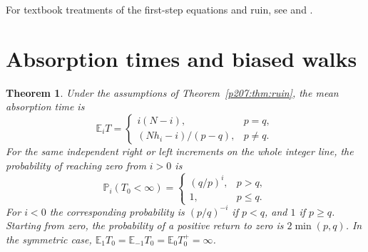 \documentclass[11pt,oneside,openany]{book}
\theoremstyle{plain}
\newtheorem{theorem}{Theorem}[chapter]
\theoremstyle{definition}
\theoremstyle{remark}
\begin{document}
For textbook treatments of the first-step equations and ruin,
see \cite[\S\S1.3 and 1.6]{Norris} and \cite[\S4.8.1]{Durrett}.

\section{Absorption times and biased walks}\label{p207:W21}

\begin{theorem}\label{p207:thm:ruin-time}
Under the assumptions of Theorem~\ref{p207:thm:ruin}, the mean absorption
time is
\[
 \mathbb E_i T=
 \begin{cases}
  i(N-i), & p=q,\\[2pt]
  (N h_i-i)/(p-q), & p\ne q.
 \end{cases}
\]
For the same independent right or left increments on the whole integer
line, the probability of reaching zero from \(i>0\) is
\[
 \mathbb P_i(T_0<\infty)=
 \begin{cases}
  (q/p)^i, & p>q,\\
  1, & p\leq q .
 \end{cases}
\]
For \(i<0\) the corresponding probability is \((p/q)^{-i}\) if \(p<q\),
and \(1\) if \(p\geq q\). Starting from zero, the probability of a
positive return to zero is \(2\min(p,q)\). In the symmetric case,
\(\mathbb E_1 T_0=\mathbb E_{-1} T_0=\mathbb E_0 T_0^+=\infty\).
\end{theorem}
\end{document}
